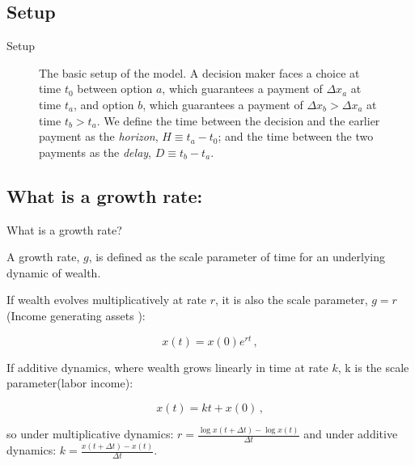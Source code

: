 \documentclass{beamer}
\newcommand{\flabel}[1]{\label{fig:#1}}
\newcommand{\be}{\begin{equation}}
\newcommand{\ee}{\end{equation}}
\newcommand{\Dt}{\Delta t}
\newcommand{\Dx}{\Delta x}
\newcommand{\del}{D}
\newcommand{\hor}{H}
\numberwithin{equation}{section}
\begin{document}
\subsection{Setup}
\begin{frame}{Setup}
\begin{figure}[!htb]
\centering
{}
\caption{The basic setup of the model. A decision maker faces a choice at time $t_0$ between option $a$, which guarantees a payment of $\Dx_a$ at time $t_a$, and option $b$, which guarantees a payment of $\Dx_b>\Dx_a$ at time $t_b>t_a$. We define the time between the decision and the earlier payment as the {\it horizon}, $\hor\equiv t_a-t_0$; and the time between the two payments as the {\it delay}, $\del\equiv t_b-t_a$.}
\flabel{basicsetup}
\end{figure}
\end{frame}

\subsection{What is a growth rate:}
\begin{frame}{What is a growth rate?}

 A growth rate, $g$, is defined as the scale parameter of time for an underlying dynamic of wealth. 

If wealth evolves multiplicatively at rate $r$, it is also the scale parameter, $g=r$(Income generating assets ):

\be
x\left(t\right) = x\left(0\right) e^{r t}\,,
\ee

If additive dynamics, where wealth grows linearly in time at rate $k$, k is the scale parameter(labor income):

\be
x\left(t\right) = k t + x\left(0\right)\,,
\ee

so under multiplicative dynamics: $r = \frac{\log x(t+\Dt)-\log x(t)}{\Dt}$ and under additive dynamics: $k = \frac{x\left(t+\Dt\right)-x\left(t\right)}{\Dt}$.
\end{frame}
\end{document}
